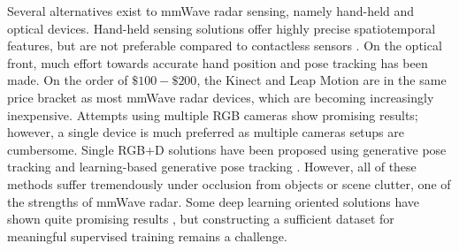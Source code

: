 \documentclass[10pt,journal,final]{IEEEtran}
\begin{document}
Several alternatives exist to mmWave radar sensing, namely hand-held and optical devices. Hand-held sensing solutions offer highly precise spatiotemporal features, but are not preferable compared to contactless sensors \cite{pardue2013hand,neto2010high}. On the optical front, much effort towards accurate hand position and pose tracking has been made. On the order of $\$100-\$200$, the Kinect and Leap Motion are in the same price bracket as most mmWave radar devices, which are becoming increasingly inexpensive. Attempts using multiple RGB cameras \cite{ballan2012motion,sridhar2013interactive} show promising results; however, a single device is much preferred as multiple cameras setups are cumbersome. Single RGB+D solutions have been proposed using generative pose tracking \cite{oikonomidis2011efficient,tang2015opening} and learning-based generative pose tracking \cite{sridhar2015fast,taylor2016efficient}. However, all of these methods suffer tremendously under occlusion from objects or scene clutter, one of the strengths of mmWave radar. Some deep learning oriented solutions have shown quite promising results \cite{tompson2014real,ye2016spatial}, but constructing a sufficient dataset for meaningful supervised training remains a challenge. 
\end{document}
